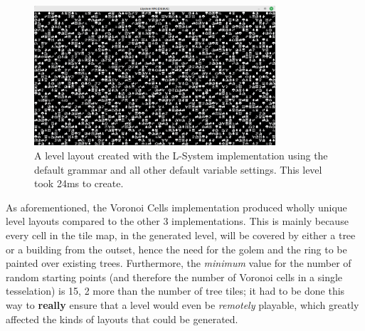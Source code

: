 \begin{figure}[H]
    \centering
    \includegraphics[width=0.8\textwidth]{Images/lsystem2-24ms.png}
    \caption{A level layout created with the L-System implementation using the default grammar and all other default variable settings. This level took 24ms to create.}
    \label{fig:lsys2}
\end{figure}

As aforementioned, the Voronoi Cells implementation produced wholly unique level layouts compared to the other 3 implementations. This is mainly because every cell in the tile map, in the generated level, will be covered by either a tree or a building from the outset, hence the need for the golem and the ring to be painted over existing trees. Furthermore, the \textit{minimum} value for the number of random starting points (and therefore the number of Voronoi cells in a single tesselation) is 15, 2 more than the number of tree tiles; it had to be done this way to \textbf{really} ensure that a level would even be \textit{remotely} playable, which greatly affected the kinds of layouts that could be generated.
